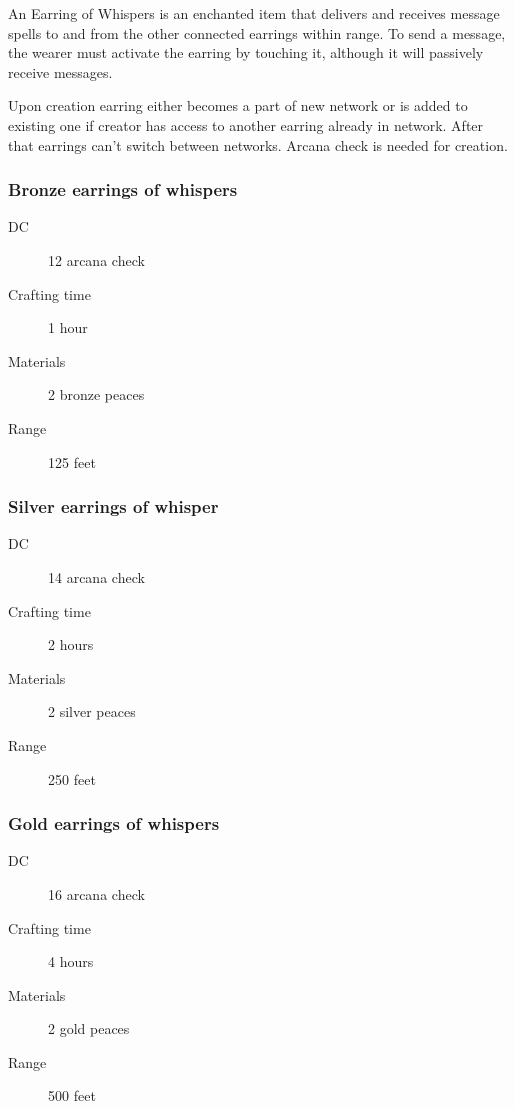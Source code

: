 An Earring of Whispers is an enchanted item that delivers and receives message spells to and from the other connected earrings within range. To send a message, the wearer must activate the earring by touching it, although it will passively receive messages.

Upon creation earring either becomes a part of new network or is added to existing one if creator has access to another earring already in network. After that earrings can't switch between networks. Arcana check is needed for creation.

\subsubsection{Bronze earrings of whispers}

\begin{description}
\item [DC] 12 arcana check
\item [Crafting time] 1 hour
\item [Materials] 2 bronze peaces
\item [Range] 125 feet
\end{description}

\subsubsection{Silver earrings of whisper}

\begin{description}
\item [DC] 14 arcana check
\item [Crafting time] 2 hours
\item [Materials] 2 silver peaces
\item [Range] 250 feet
\end{description}

\subsubsection{Gold earrings of whispers}

\begin{description}
\item [DC] 16 arcana check
\item [Crafting time] 4 hours
\item [Materials] 2 gold peaces
\item [Range] 500 feet
\end{description}

